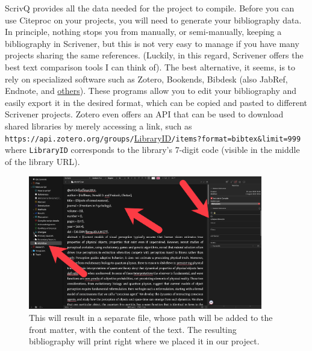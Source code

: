 \documentclass[
  12pt,
  a4paper,
  oneside,
  titlepage,
  toclink=all,
  toc=bibliography]{scrbook}
\theoremstyle{definition}
\theoremstyle{plain}
\theoremstyle{plain}
\theoremstyle{plain}
\theoremstyle{plain}
\theoremstyle{definition}
\theoremstyle{definition}
\theoremstyle{plain}
\theoremstyle{remark}
\begin{document}
ScrivQ provides all the data needed for the project to compile. Before
you can use Citeproc on your projects, you will need to generate your
bibliography data. In principle, nothing stops you from manually, or
semi-manually, keeping a bibliography in Scrivener, but this is not very
easy to manage if you have many projects sharing the same references.
(Luckily, in this regard, Scrivener offers the best text comparison
tools I can think of). The best alternative, it seems, is to rely on
specialized software such as Zotero, Bookends, Bibdesk (also JabRef,
Endnote, and
\href{en.wikipedia.org/wiki/Comparison_of_reference_management_software}{others}).
These programs allow you to edit your bibliography and easily export it
in the desired format, which can be copied and pasted to different
Scrivener projects. Zotero even offers an API that can be used to
download shared libraries by merely accessing a link, such as
\texttt{https://api.zotero.org/groups/}\ul{LibraryID}\texttt{/items?format=bibtex\&limit=999}
where \texttt{LibraryID} corresponds to the library's 7-digit code
(visible in the middle of the library URL).

\begin{figure}

{\centering \includegraphics[width=4.02083in,height=2.30208in]{newbibliography.png}

}

\caption{\label{fig-scriv49A}This will result in a separate file, whose
path will be added to the front matter, with the content of the text.
The resulting bibliography will print right where we placed it in our
project.}

\end{figure}
\end{document}
